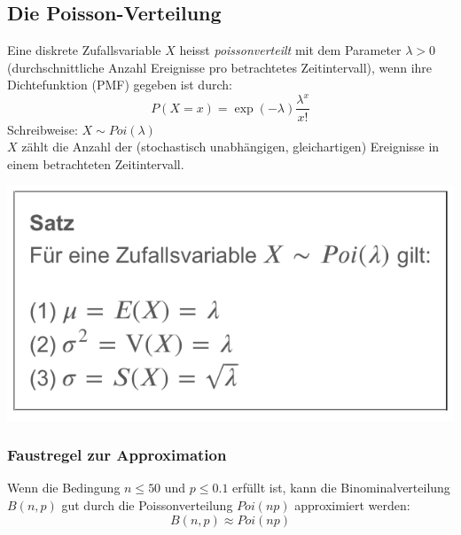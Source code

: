 \subsection{Die Poisson-Verteilung}
\label{subsec:poisson_verteilung}
Eine diskrete Zufallsvariable $X$ heisst \textit{poissonverteilt} mit dem Parameter $\lambda > 0$ (durchschnittliche Anzahl Ereignisse pro betrachtetes Zeitintervall),
wenn ihre Dichtefunktion (PMF) gegeben ist durch:
\begin{equation*}
    P(X = x) = \exp(-\lambda)\frac{\lambda^x}{x!}
\end{equation*}
Schreibweise: $X \sim Poi(\lambda)$ \\
$X$ zählt die Anzahl der (stochastisch unabhängigen, gleichartigen) Ereignisse in einem betrachteten Zeitintervall. \\
\begin{center}
    \includegraphics[width=0.5\linewidth]{images/satz5.png}
\end{center}
\subsubsection{Faustregel zur Approximation}
\label{subsubsec:faustregel_approximation}
Wenn die Bedingung $n \leq 50$ und $p \leq 0.1$ erfüllt ist, kann die Binominalverteilung $B(n,p)$ gut durch die Poissonverteilung
$Poi(np)$ approximiert werden:
\begin{equation*}
    B(n,p) \approx Poi(np)
\end{equation*}
